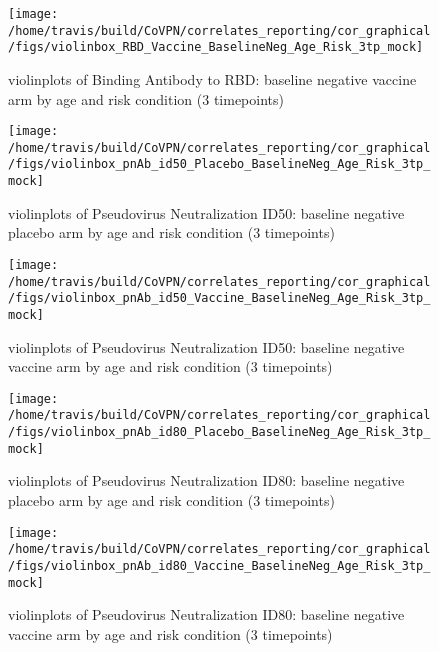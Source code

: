 \documentclass[]{book}
\theoremstyle{definition}
\theoremstyle{definition}
\theoremstyle{definition}
\newcommand{\1}{\mathbbm{1}}
\begin{document}
\clearpage
\begin{figure}[H]

{\centering \texttt{[image: /home/travis/build/CoVPN/correlates\_reporting/cor\_graphical/figs/violinbox\_RBD\_Vaccine\_BaselineNeg\_Age\_Risk\_3tp\_mock]} 

}

\caption{violinplots of Binding Antibody to RBD: baseline negative vaccine arm by age and risk condition (3 timepoints)}\label{fig:unnamed-chunk-150}
\end{figure}

\clearpage
\begin{figure}[H]

{\centering \texttt{[image: /home/travis/build/CoVPN/correlates\_reporting/cor\_graphical/figs/violinbox\_pnAb\_id50\_Placebo\_BaselineNeg\_Age\_Risk\_3tp\_mock]} 

}

\caption{violinplots of Pseudovirus Neutralization ID50: baseline negative placebo arm by age and risk condition (3 timepoints)}\label{fig:unnamed-chunk-151}
\end{figure}

\clearpage
\begin{figure}[H]

{\centering \texttt{[image: /home/travis/build/CoVPN/correlates\_reporting/cor\_graphical/figs/violinbox\_pnAb\_id50\_Vaccine\_BaselineNeg\_Age\_Risk\_3tp\_mock]} 

}

\caption{violinplots of Pseudovirus Neutralization ID50: baseline negative vaccine arm by age and risk condition (3 timepoints)}\label{fig:unnamed-chunk-152}
\end{figure}

\clearpage
\begin{figure}[H]

{\centering \texttt{[image: /home/travis/build/CoVPN/correlates\_reporting/cor\_graphical/figs/violinbox\_pnAb\_id80\_Placebo\_BaselineNeg\_Age\_Risk\_3tp\_mock]} 

}

\caption{violinplots of Pseudovirus Neutralization ID80: baseline negative placebo arm by age and risk condition (3 timepoints)}\label{fig:unnamed-chunk-153}
\end{figure}

\clearpage
\begin{figure}[H]

{\centering \texttt{[image: /home/travis/build/CoVPN/correlates\_reporting/cor\_graphical/figs/violinbox\_pnAb\_id80\_Vaccine\_BaselineNeg\_Age\_Risk\_3tp\_mock]} 

}

\caption{violinplots of Pseudovirus Neutralization ID80: baseline negative vaccine arm by age and risk condition (3 timepoints)}\label{fig:unnamed-chunk-154}
\end{figure}
\end{document}
